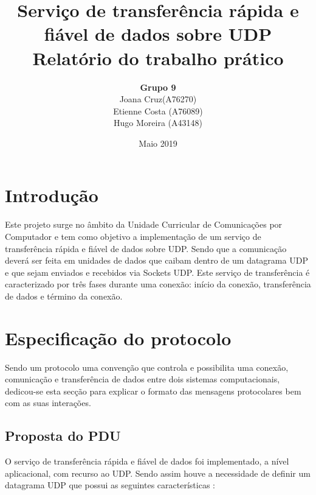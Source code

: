\documentclass{article}
\title{
       \vspace{60px}
       \Huge \textbf{Serviço de transferência rápida e fiável de dados sobre UDP} \\[15px]
       \Large \textbf{Relatório do trabalho prático}
      }
\author{
        \begin{tabular}{c}
            \textbf{Grupo 9} \\[5px]
                Joana Cruz(A76270) \\
                Etienne Costa (A76089) \\
                Hugo Moreira (A43148)
        \end{tabular}
       }
\date{Maio 2019}
\begin{document}
\maketitle

\newpage
\section{Introdução}

Este projeto surge no âmbito da Unidade Curricular de Comunicações por Computador e tem como objetivo a implementação de  um serviço de transferência rápida e fiável de dados sobre UDP. Sendo que a comunicação deverá ser feita em unidades de dados que caibam dentro de um datagrama UDP e que sejam enviados e recebidos via Sockets UDP.
Este serviço de transferência é caracterizado por três fases durante uma conexão: início da conexão, transferência de dados e término da conexão.


\section{Especificação do protocolo}

Sendo um protocolo uma convenção que controla e possibilita uma conexão, comunicação e transferência de dados entre dois 
sistemas computacionais, dedicou-se esta secção para explicar o formato das mensagens protocolares bem com as suas interações.

\subsection{Proposta do PDU}

O serviço de transferência rápida e fiável de dados foi implementado, a nível aplicacional, com recurso ao UDP. Sendo assim houve a necessidade de definir um datagrama UDP  que possui as seguintes características :
\end{document}
